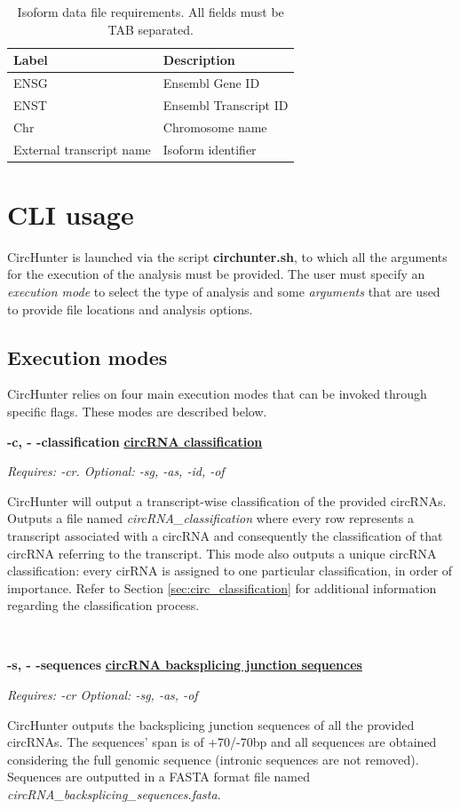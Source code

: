 \documentclass[letterpaper,12pt]{article}
\newcommand{\entry}[4]{
  \begin{minipage}[t]{.05\textwidth}
  \end{minipage}
  \hfill\vline\hfill
  \begin{minipage}[t]{.90\textwidth}
    {\bfseries#1} {\hfill\underline{\bfseries#2}}
    
    \textit{#3}
    
    {#4}
  \end{minipage}\\\vspace{.25cm}}
\begin{document}
\begin{table}[h]
    \centering
    \begin{tabular}{l | l}
        Label & Description \\
        \hline \hline
        ENSG & Ensembl Gene ID \\
        ENST & Ensembl Transcript ID \\
        Chr & Chromosome name \\
        External transcript name & Isoform identifier \\
    \end{tabular}
    \caption{Isoform data file requirements. All fields must be TAB separated.}
    \label{tab:isoform_data_file}
\end{table}

\section{CLI usage}
CircHunter is launched via the script \textbf{circhunter.sh}, to which all the arguments for the execution of the analysis must be provided. The user must specify an \textit{execution mode} to select the type of analysis and some \textit{arguments} that are used to provide file locations and analysis options.

\subsection{Execution modes}
CircHunter relies on four main execution modes that can be invoked through specific flags. These modes are described below.

\vspace{0.25in}

\entry
{-c, - -classification}
{circRNA classification}
{Requires: -cr. \hspace{0.25in} Optional: -sg, -as, -id, -of }
{CircHunter will output a transcript-wise classification of the provided circRNAs. Outputs a file named \textit{circRNA\_classification} where every row represents a transcript associated with a circRNA and consequently the classification of that circRNA referring to the transcript. This mode also outputs a unique circRNA classification: every cirRNA is assigned to one particular classification, in order of importance. Refer to Section \ref{sec:circ_classification} for additional information regarding the classification process.}

\entry
{-s, - -sequences}
{circRNA backsplicing junction sequences}
{Requires: -cr \hspace{0.25in} Optional: -sg, -as, -of}
{CircHunter outputs the backsplicing junction sequences of all the provided circRNAs. The sequences' span is of +70/-70bp and all sequences are obtained considering the full genomic sequence (intronic sequences are not removed). Sequences are outputted in a FASTA format file named \textit{circRNA\_backsplicing\_sequences.fasta}.}
\end{document}
